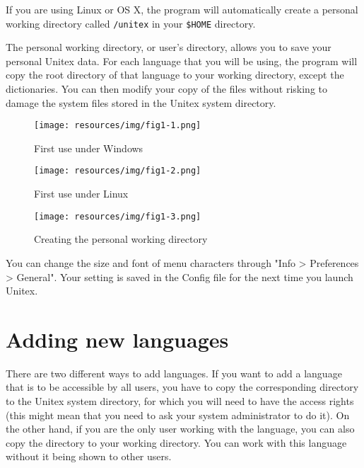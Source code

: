 \bigskip
\noindent If you are using Linux or OS X, the program will automatically create a
personal working directory called \verb+/unitex+ in your \verb+$HOME+ directory.

\bigskip
\noindent The personal working directory, or user's directory, allows
you to save your personal Unitex data. For each language that you will be using, the
program will copy the root directory of that language to your working
directory, except the dictionaries. You can then modify your copy of the
files without risking to damage the system files stored in the
Unitex system directory.

\begin{figure}[!ht]
\begin{center}
\texttt{[image: resources/img/fig1-1.png]}
\caption{First use under Windows}
\end{center}
\end{figure}

\begin{figure}[!ht]
\begin{center}
\texttt{[image: resources/img/fig1-2.png]}
\caption{First use under Linux}
\end{center}
\end{figure}

\begin{figure}[!ht]
\begin{center}
\texttt{[image: resources/img/fig1-3.png]}
\caption{Creating the personal working
directory\label{fig-creation-personal-directory}}
\end{center}
\end{figure}

\bigskip
\noindent You can change the size and font of menu characters through "Info > Preferences > General". Your setting is saved in the Config file for the next time you launch Unitex.

\section{Adding new languages}

\bigskip
\noindent There are two different ways to add languages. If you want to add 
a language that is to be accessible by all  users, you have to copy the 
corresponding directory to the Unitex system directory, for which 
you will need to have the access rights  (this might mean that you need to 
ask your system administrator to do it). On the other hand, if you are the only user working
with the language, you can also copy the directory to your working 
directory.
You can work with this language without it being shown to other users.


